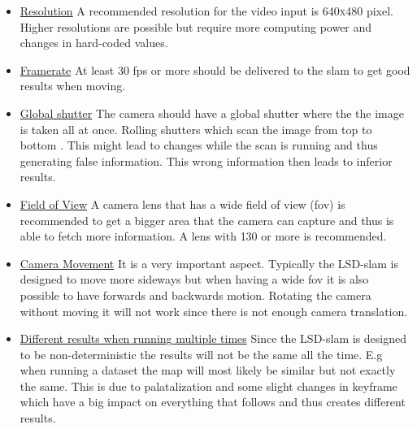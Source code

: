 \begin{itemize}
    \item \underline{Resolution} \newline
    A recommended resolution for the video input is \textsc{640x480} pixel. Higher resolutions are possible but require more computing power and changes in hard-coded values.
    
    \item \underline{Framerate} \newline
    At least 30 \gls{fps} or more should be delivered to the \gls{slam} to get good results when moving.
    
    \item \underline{Global shutter} \newline
    The camera should have a global shutter where the the image is taken all at once. Rolling shutters which scan the image from top to bottom \cite{globalrollingshutter}. This might lead to changes while the scan is running and thus generating false information. This wrong information then leads to inferior results.
    
    \item \underline{Field of View} \newline
    A camera lens that has a wide field of view (\gls{fov}) is recommended to get a bigger area that the camera can capture and thus is able to fetch more information. A lens with \textsc{130\degree} or more is recommended.
    
    \item \underline{Camera Movement} \newline
    It is a very important aspect. Typically the LSD-\gls{slam} is designed to move more sideways but when having a wide \gls{fov} it is also possible to have forwards and backwards motion.
    Rotating the camera without moving it will not work since there is not enough camera translation. 
    
    \item \underline{Different results when running multiple times} \newline
    Since the LSD-\gls{slam} is designed to be non-deterministic the results will not be the same all the time. E.g when running a dataset the map will most likely be similar but not exactly the same. This is due to palatalization and some slight changes in keyframe which have a big impact on everything that follows and thus creates different results.
    
\end{itemize}




